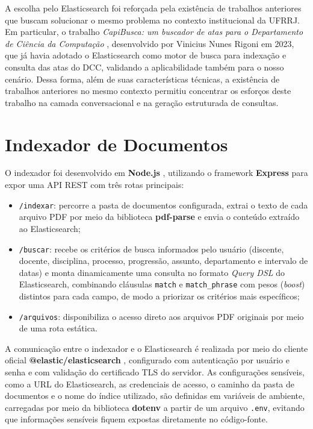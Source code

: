A escolha pelo Elasticsearch foi reforçada pela existência de trabalhos anteriores que buscam solucionar o mesmo problema no contexto institucional da UFRRJ. Em particular, o trabalho \textit{CapiBusca: um buscador de atas para o Departamento de Ciência da Computação} \cite{rigoni2023capibusca}, desenvolvido por Vinicius Nunes Rigoni em 2023, que já havia adotado o Elasticsearch como motor de busca para indexação e consulta das atas do DCC, validando a aplicabilidade também para o nosso cenário. Dessa forma, além de suas características técnicas, a existência de trabalhos anteriores no mesmo contexto permitiu concentrar os esforços deste trabalho na camada conversacional e na geração estruturada de consultas.

\section{Indexador de Documentos}\label{sec:indexador-documentos}

O indexador foi desenvolvido em \textbf{Node.js} \cite{nodejs-docs}, utilizando o framework \textbf{Express} \cite{expressjs-docs} para expor uma API REST com três rotas principais:

\begin{itemize}
  \item \texttt{/indexar}: percorre a pasta de documentos configurada, extrai o texto de cada arquivo PDF por meio da biblioteca \textbf{pdf-parse} \cite{pdfparse-npm} e envia o conteúdo extraído ao Elasticsearch;
  \item \texttt{/buscar}: recebe os critérios de busca informados pelo usuário (discente, docente, disciplina, processo, progressão, assunto, departamento e intervalo de datas) e monta dinamicamente uma consulta no formato \textit{Query DSL} do Elasticsearch, combinando cláusulas \texttt{match} e \texttt{match\_phrase} com pesos (\textit{boost}) distintos para cada campo, de modo a priorizar os critérios mais específicos;
  \item \texttt{/arquivos}: disponibiliza o acesso direto aos arquivos PDF originais por meio de uma rota estática.
\end{itemize}

A comunicação entre o indexador e o Elasticsearch é realizada por meio do cliente oficial \textbf{@elastic/elasticsearch} \cite{elasticsearch-js}, configurado com autenticação por usuário e senha e com validação do certificado TLS do servidor. As configurações sensíveis, como a URL do Elasticsearch, as credenciais de acesso, o caminho da pasta de documentos e o nome do índice utilizado, são definidas em variáveis de ambiente, carregadas por meio da biblioteca \textbf{dotenv} \cite{dotenv-npm} a partir de um arquivo \texttt{.env}, evitando que informações sensíveis fiquem expostas diretamente no código-fonte.

